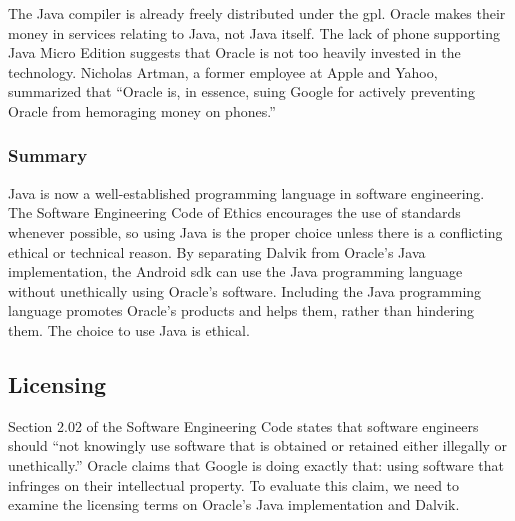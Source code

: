 \documentclass[11pt]{article}
\begin{document}
\begin{multicols}{2}
The Java compiler is already freely distributed under the \gls{gpl}.  Oracle
makes their money in services relating to Java, not Java itself.  The lack of
phone supporting Java Micro Edition suggests that Oracle is not too heavily
invested in the technology.  Nicholas Artman, a former employee at Apple and
Yahoo, summarized that ``Oracle is, in essence, suing Google for actively
preventing Oracle from hemoraging money on phones.'' \cite{artman}


\subsubsection{Summary} %
\label{ssub:java-summary}

Java is now a well-established programming language in software engineering.
The Software Engineering Code of Ethics encourages the use of standards whenever
possible, so using Java is the proper choice unless there is a conflicting
ethical or technical reason.  By separating Dalvik from Oracle's Java
implementation, the Android \gls{sdk} can use the Java programming language
without unethically using Oracle's software.  Including the Java programming
language promotes Oracle's products and helps them, rather than hindering them.
The choice to use Java is ethical.



\subsection{Licensing} %
\label{sub:licensing}

Section 2.02 of the Software Engineering Code states that software engineers
should ``not knowingly use software that is obtained or retained either
illegally or unethically.'' \cite[\S 2.02]{secode}  Oracle claims that Google is
doing exactly that: using software that infringes on their intellectual
property.  To evaluate this claim, we need to examine the licensing terms on
Oracle's Java implementation and Dalvik.


\end{multicols}
\end{document}
